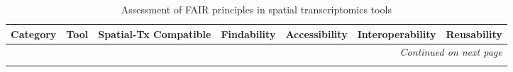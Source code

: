 \begin{dissertationintroduction}
\setlength\LTleft{0pt}
\setlength\LTright{0pt}
\begin{small}
    \renewcommand\thetable{0.1}
    \begin{landscape} %
        \begin{longtable}{l l l l l l l}
            \caption{Assessment of FAIR principles in spatial transcriptomics tools}\label{tab:spatial-tx tools assessment}
            \\ \hline 

            \multicolumn{1}{l}{\textbf{Category}} & \multicolumn{1}{l}{\textbf{Tool}} & \multicolumn{1}{l}{\textbf{Spatial-Tx Compatible}} & \multicolumn{1}{l}{\textbf{Findability}} & \multicolumn{1}{l}{\textbf{Accessibility}} & \multicolumn{1}{l}{\textbf{Interoperability}} & \multicolumn{1}{l}{\textbf{Reusability}} \\ \hline \endhead 

            
            \hline \multicolumn{7}{r}{\textit{Continued on next page}} \\ \hline \endfoot
            \hline \endlastfoot
            


\end{longtable}
\end{landscape}
\end{small}
\end{dissertationintroduction}
